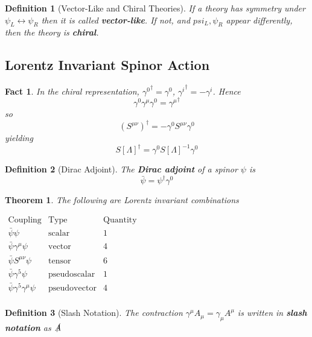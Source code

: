 \documentclass{article}
\newtheorem{theorem}{Theorem}[subsection]
\newtheorem{definition}{Definition}[subsection]
\newtheorem{fact}{Fact}[subsection]
\newcommand{\bam}[1]{\textbf{#1}}
\begin{document}
\begin{definition}[Vector-Like and Chiral Theories]
If a theory has symmetry under $\psi_L \leftrightarrow \psi_R$ then it is called \bam{vector-like}. If not, and $psi_L, \psi_R$ appear differently, then the theory is \bam{chiral}. 
\end{definition}

\subsection{Lorentz Invariant Spinor Action}

\begin{fact}
In the chiral representation, ${\gamma^0}^\dagger=\gamma^0$, ${\gamma^i}^\dagger=-\gamma^i$. Hence
\[
\gamma^0 \gamma^\mu \gamma^0={\gamma^\mu}^\dagger
\]
so 
\[
(S^{\mu\nu})^\dagger=-\gamma^0 S^{\mu\nu} \gamma^0
\]
yielding
\[
S[\Lambda]^\dagger=\gamma^0 S[\Lambda]^{-1} \gamma^0
\]
\end{fact}

\begin{definition}[Dirac Adjoint]
The \bam{Dirac adjoint} of a spinor $\psi$ is 
\[
\bar{\psi}=\psi^\dagger \gamma^0
\]
\end{definition}

\begin{theorem}
The following are Lorentz invariant combinations
\begin{center}$
\begin{array}{ccc}
    \text{Coupling} & \text{Type} & \text{Quantity} \\
    \hline
    \hline
    \bar{\psi}\psi & \text{scalar} & 1 \\
    \bar{\psi}\gamma^\mu\psi & \text{vector} & 4 \\
    \bar{\psi} S^{\mu\nu} \psi & \text{tensor} & 6 \\
    \bar{\psi}\gamma^5\psi & \text{pseudoscalar} & 1 \\
    \bar{\psi}\gamma^5\gamma^\mu\psi & \text{pseudovector} & 4 \\
\end{array}
$\end{center}
\end{theorem}

\begin{definition}[Slash Notation]
The contraction $\gamma^\mu A_\mu=\gamma_\mu A^\mu$ is written in \bam{slash notation} as $\slashed{A}$
\end{definition}
\end{document}
